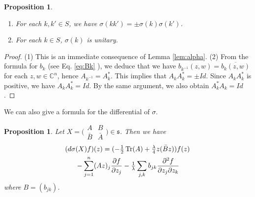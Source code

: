 \documentclass[12pt]{amsart}
\numberwithin{equation}{section}
\newtheorem{proposition}[theorem]{Proposition}
\begin{document}
\begin{proposition} \begin{enumerate} \item For each $k, k'\in S$, we have $\sigma (kk')=\pm
\sigma(k)\sigma(k')$.
\item For each $k\in S$, $\sigma(k)$ is unitary.
\end{enumerate}
\end{proposition}

\begin{proof} (1) This is an immediate consequence of Lemma \ref{lem:alpha}.
(2) From the formula for $b_k$ (see Eq. \ref{eq:Bk} ), we deduce that we have
$b_{k^{-1}}(z,w)=\overline {b_k(z,w)}$ for each $z,w \in {\mathbb C}^n$, hence
$A_{k^{-1}}=A_k^{\ast}$. This implies that $A_kA_k^{\ast}=\pm Id$. Since
$A_kA_k^{\ast}$ is positive, we have  $A_kA_k^{\ast}= Id$. By the same argument,
we also obtain $A_k^{\ast}A_k= Id$.
\end{proof}

We can also give a formula for the differential of $\sigma$.
\begin{proposition} Let $X=\bigl(\begin{smallmatrix} A&B\\
{\bar B}&{\bar A} \end{smallmatrix}\bigr)\in {\mathfrak s}$. Then we have
\begin{align*}(d\sigma &(X)f)(z)=(-\tfrac{1}{2}\operatorname{Tr}(A)+\tfrac{\lambda}{4}z({\bar B}z))f(z)\\
&-\sum_{j=1}^{n}(Az)_j\frac{\partial f}{\partial z_j}-\tfrac{1}{\lambda}\sum_{j,k}b_{jk}
\frac{\partial^2f}{\partial z_j\partial z_k}
\end{align*} where $B=(b_{jk})$.
\end{proposition}
\end{document}
